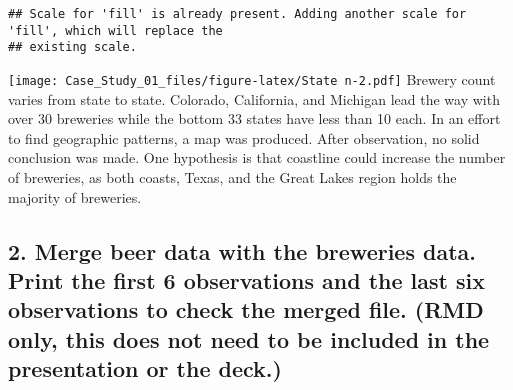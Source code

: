 \documentclass[
]{article}
\newenvironment{Shaded}{\begin{snugshade}}{\end{snugshade}}
\newcommand{\AttributeTok}[1]{\textcolor[rgb]{0.77,0.63,0.00}{#1}}
\newcommand{\CommentTok}[1]{\textcolor[rgb]{0.56,0.35,0.01}{\textit{#1}}}
\newcommand{\DecValTok}[1]{\textcolor[rgb]{0.00,0.00,0.81}{#1}}
\newcommand{\FunctionTok}[1]{\textcolor[rgb]{0.00,0.00,0.00}{#1}}
\newcommand{\NormalTok}[1]{#1}
\newcommand{\OtherTok}[1]{\textcolor[rgb]{0.56,0.35,0.01}{#1}}
\newcommand{\SpecialCharTok}[1]{\textcolor[rgb]{0.00,0.00,0.00}{#1}}
\newcommand{\StringTok}[1]{\textcolor[rgb]{0.31,0.60,0.02}{#1}}
\begin{document}
\begin{Shaded}
\end{Shaded}

\begin{verbatim}
## Scale for 'fill' is already present. Adding another scale for 'fill', which will replace the
## existing scale.
\end{verbatim}

\texttt{[image: Case\_Study\_01\_files/figure-latex/State n-2.pdf]} Brewery
count varies from state to state. Colorado, California, and Michigan
lead the way with over 30 breweries while the bottom 33 states have less
than 10 each. In an effort to find geographic patterns, a map was
produced. After observation, no solid conclusion was made. One
hypothesis is that coastline could increase the number of breweries, as
both coasts, Texas, and the Great Lakes region holds the majority of
breweries.

\hypertarget{merge-beer-data-with-the-breweries-data.-print-the-first-6-observations-and-the-last-six-observations-to-check-the-merged-file.-rmd-only-this-does-not-need-to-be-included-in-the-presentation-or-the-deck.}{%
\subsection{2. Merge beer data with the breweries data. Print the first
6 observations and the last six observations to check the merged file.
(RMD only, this does not need to be included in the presentation or the
deck.)}\label{merge-beer-data-with-the-breweries-data.-print-the-first-6-observations-and-the-last-six-observations-to-check-the-merged-file.-rmd-only-this-does-not-need-to-be-included-in-the-presentation-or-the-deck.}}
\end{document}
